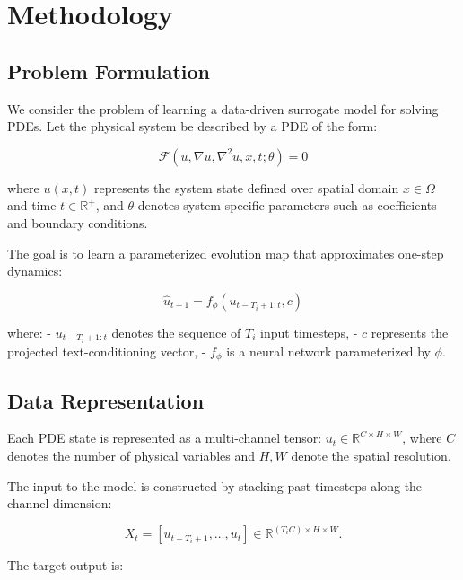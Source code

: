\documentclass[
]{article}
\begin{document}
\section{Methodology}\label{methodology}

\subsection{Problem Formulation}\label{problem-formulation}

We consider the problem of learning a data-driven surrogate model for
solving PDEs. Let the physical system be described by a PDE of the form:

\begin{equation}
\mathcal{F}(u, \nabla u, \nabla^2 u, x, t; \theta) = 0
\end{equation}

where \(u(x,t)\) represents the system state defined over spatial domain
\(x \in \Omega\) and time \(t \in \mathbb{R}^+\), and \(\theta\) denotes
system-specific parameters such as coefficients and boundary conditions.

The goal is to learn a parameterized evolution map that approximates
one-step dynamics:

\begin{equation}
\hat{u}_{t+1} = f_\phi(u_{t-T_i+1:t}, c)
\end{equation}

where: - \(u_{t-T_i+1:t}\) denotes the sequence of \(T_i\) input
timesteps, - \(c\) represents the projected text-conditioning vector, -
\(f_\phi\) is a neural network parameterized by \(\phi\).

\subsection{Data Representation}\label{data-representation}

Each PDE state is represented as a multi-channel tensor:
\(u_t \in \mathbb{R}^{C \times H \times W}\), where \(C\) denotes the
number of physical variables and \(H, W\) denote the spatial resolution.

The input to the model is constructed by stacking past timesteps along
the channel dimension:

\begin{equation}
X_t = [u_{t-T_i+1}, \ldots, u_t] \in \mathbb{R}^{(T_i C) \times H \times W}.
\end{equation}

The target output is:
\end{document}
